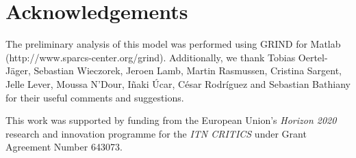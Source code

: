 \section{Acknowledgements}
\label{sec:Acknowledgements}
The preliminary analysis of this model was performed using GRIND for Matlab (http://www.sparcs-center.org/grind). Additionally, we thank Tobias Oertel-Jäger, Sebastian Wieczorek, Jeroen Lamb, Martin Rasmussen, Cristina Sargent, Jelle Lever, Moussa N'Dour, Iñaki Úcar, César Rodríguez and Sebastian Bathiany for their useful comments and suggestions. 

This work was supported by funding from the European Union's \textit{Horizon 2020} research and innovation programme for the \textit{ITN CRITICS} under Grant Agreement Number 643073.
